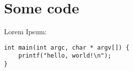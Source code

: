 \documentclass[10pt]{article}
\begin{document}
\section{Some code}
 
Lorem Ipsum:

\begin{lstlisting}
int main(int argc, char * argv[]) {
    printf("hello, world!\n");
}
\end{lstlisting}
\end{document}
